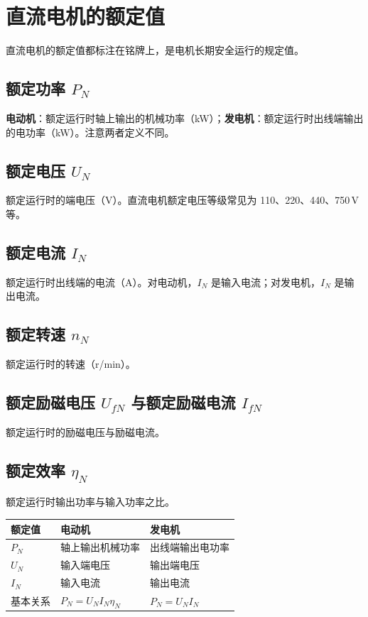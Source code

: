 \section{直流电机的额定值}

直流电机的额定值都标注在铭牌上，是电机长期安全运行的规定值。

\subsection{额定功率 $P_N$}
\textbf{电动机}：额定运行时轴上输出的机械功率（kW）；\textbf{发电机}：额定运行时出线端输出的电功率（kW）。注意两者定义不同。

\subsection{额定电压 $U_N$}
额定运行时的端电压（V）。直流电机额定电压等级常见为 110、220、440、750\,V 等。

\subsection{额定电流 $I_N$}
额定运行时出线端的电流（A）。对电动机，$I_N$ 是输入电流；对发电机，$I_N$ 是输出电流。

\subsection{额定转速 $n_N$}
额定运行时的转速（r/min）。

\subsection{额定励磁电压 $U_{fN}$ 与额定励磁电流 $I_{fN}$}
额定运行时的励磁电压与励磁电流。

\subsection{额定效率 $\eta_N$}
额定运行时输出功率与输入功率之比。

\begin{center}
\begin{tabular}{@{}lll@{}}
\toprule
额定值 & 电动机 & 发电机 \\
\midrule
$P_N$ & 轴上输出机械功率 & 出线端输出电功率 \\
$U_N$ & 输入端电压 & 输出端电压 \\
$I_N$ & 输入电流 & 输出电流 \\
基本关系 & $P_N=U_NI_N\eta_N$ & $P_N=U_NI_N$ \\
\bottomrule
\end{tabular}
\end{center}


